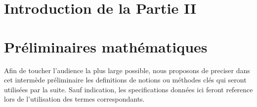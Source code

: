 


\chapter*{Introduction de la Partie II}









\bigskip



















\chapter*{Préliminaires mathématiques}


Afin de toucher l'audience la plus large possible, nous proposons de preciser dans cet intermède préliminaire les definitions de notions ou méthodes clés qui seront utilisées par la suite. Sauf indication, les specifications données ici feront reference lors de l'utilisation des termes correspondants.



